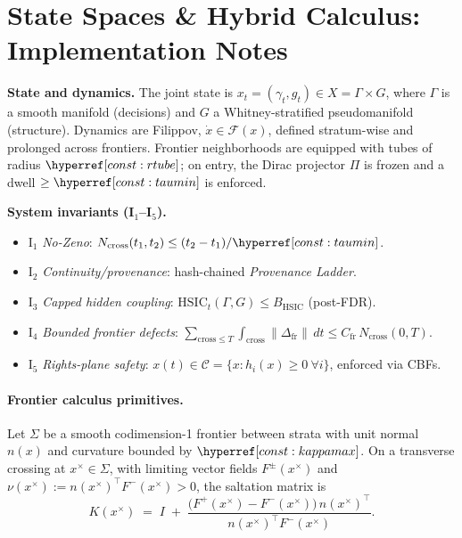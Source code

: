 \section{State Spaces \& Hybrid Calculus: Implementation Notes}\label{sec:calc2}

\noindent\textbf{State and dynamics.}
The joint state is $x_t=(\gamma_t,g_t)\in X=\Gamma\times G$, where $\Gamma$ is a smooth manifold (decisions) and $G$ a Whitney-stratified pseudomanifold (structure).
Dynamics are Filippov, $\dot x\in \mathcal F(x)$, defined stratum-wise and prolonged across frontiers.
Frontier neighborhoods are equipped with tubes of radius $\constref{rtube}$; on entry, the Dirac projector $\Pi$ is frozen and a dwell $\ge \constref{taumin}$ is enforced.

\begin{constbox}
\textbf{System invariants (I$_1$--I$_5$).}
\begin{itemize}[leftmargin=*]
\item I$_1$ \emph{No-Zeno}: $N_{\mathrm{cross}}(t_1,t_2)\le (t_2-t_1)/\constref{taumin}$.
\item I$_2$ \emph{Continuity/provenance}: hash-chained \emph{Provenance Ladder}.
\item I$_3$ \emph{Capped hidden coupling}: $\mathrm{HSIC}_t(\Gamma,G)\le B_{\mathrm{HSIC}}$ (post-FDR).
\item I$_4$ \emph{Bounded frontier defects}: $\displaystyle\sum_{\text{cross}\le T}\!\int_{\mathrm{cross}}\|\Delta_{\mathrm{fr}}\|\,dt \le C_{\mathrm{fr}}\,N_{\mathrm{cross}}(0,T)$.
\item I$_5$ \emph{Rights-plane safety}: $x(t)\in \mathcal C=\{x:h_i(x)\ge 0~\forall i\}$, enforced via CBFs.
\end{itemize}
\end{constbox}

\paragraph{Frontier calculus primitives.}
Let $\Sigma$ be a smooth codimension-1 frontier between strata with unit normal $n(x)$ and curvature bounded by $\constref{kappamax}$.
On a transverse crossing at $x^\times\in\Sigma$, with limiting vector fields $F^\pm(x^\times)$ and $\nu(x^\times):=n(x^\times)^\top F^-(x^\times)>0$, the saltation matrix is
\[
K(x^\times) \;=\; I \;+\; \frac{\big(F^+(x^\times)-F^-(x^\times)\big)\,n(x^\times)^\top}{n(x^\times)^\top F^-(x^\times)}.
\]

